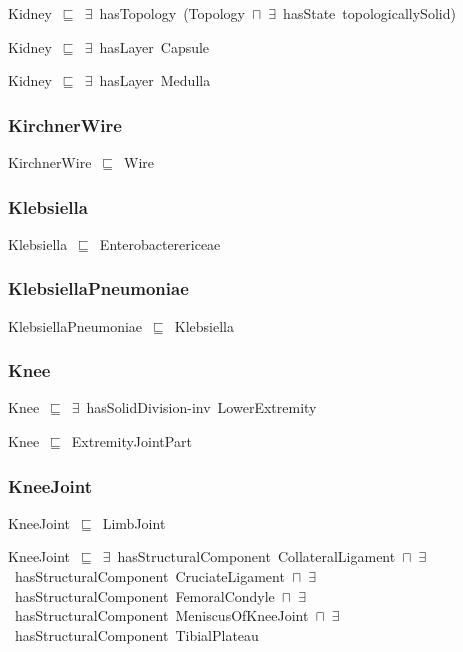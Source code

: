 \documentclass{article}
\begin{document}
Kidney~\ensuremath{\sqsubseteq}~\ensuremath{\exists}~hasTopology~(Topology~\ensuremath{\sqcap}~\ensuremath{\exists}~hasState~topologicallySolid)~

Kidney~\ensuremath{\sqsubseteq}~\ensuremath{\exists}~hasLayer~Capsule~

Kidney~\ensuremath{\sqsubseteq}~\ensuremath{\exists}~hasLayer~Medulla~

\subsubsection*{KirchnerWire}

KirchnerWire~\ensuremath{\sqsubseteq}~Wire~

\subsubsection*{Klebsiella}

Klebsiella~\ensuremath{\sqsubseteq}~Enterobacterericeae~

\subsubsection*{KlebsiellaPneumoniae}

KlebsiellaPneumoniae~\ensuremath{\sqsubseteq}~Klebsiella~

\subsubsection*{Knee}

Knee~\ensuremath{\sqsubseteq}~\ensuremath{\exists}~hasSolidDivision-inv~LowerExtremity~

Knee~\ensuremath{\sqsubseteq}~ExtremityJointPart~

\subsubsection*{KneeJoint}

KneeJoint~\ensuremath{\sqsubseteq}~LimbJoint~

KneeJoint~\ensuremath{\sqsubseteq}~\ensuremath{\exists}~hasStructuralComponent~CollateralLigament~\ensuremath{\sqcap}~\ensuremath{\exists}~hasStructuralComponent~CruciateLigament~\ensuremath{\sqcap}~\ensuremath{\exists}~hasStructuralComponent~FemoralCondyle~\ensuremath{\sqcap}~\ensuremath{\exists}~hasStructuralComponent~MeniscusOfKneeJoint~\ensuremath{\sqcap}~\ensuremath{\exists}~hasStructuralComponent~TibialPlateau~
\end{document}

